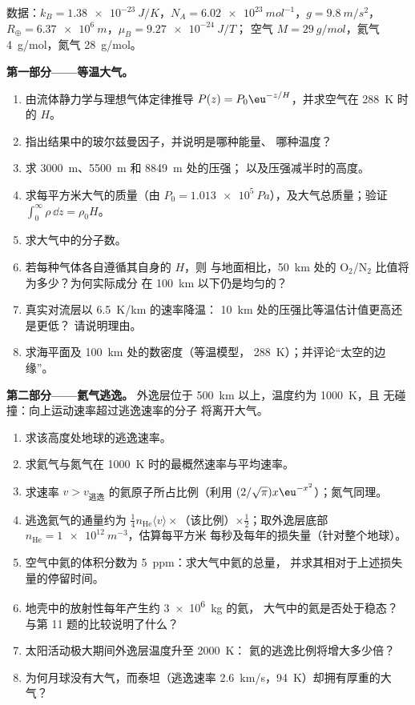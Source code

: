 \begin{problem}\label{pb:b2:boltzmann-factor:1}
数据：$k_B = \qty{1.38e-23}{J/K}$，$N_A = \qty{6.02e23}{mol^{-1}}$，$g =
\qty{9.8}{m/s^2}$，$R_{\oplus} = \qty{6.37e6}{m}$，$\mu_B = \qty{9.27e-24}{J/T}$；
空气 $M = \qty{29}{g/mol}$，氦气 \qty{4}{g/mol}，氮气 \qty{28}{g/mol}。

\textbf{第一部分——等温大气。}
\begin{enumerate}
  \item 由流体静力学与理想气体定律推导 $P(z) =
        P_0\eu^{-z/H}$，并求空气在 \qty{288}{K} 时的 $H$。
  \item 指出结果中的玻尔兹曼因子，并说明是哪种能量、
        哪种温度？
  \item 求 \qty{3000}{m}、\qty{5500}{m} 和 \qty{8849}{m} 处的压强；
        以及压强减半时的高度。
  \item 求每平方米大气的质量（由 $P_0 =
        \qty{1.013e5}{Pa}$），及大气总质量；验证 $\int_0^\infty
        \rho\,\dd z = \rho_0H$。
  \item 求大气中的分子数。
  \item 若每种气体各自遵循其自身的 $H$，则
        与地面相比，\qty{50}{km} 处的 O$_2$/N$_2$ 比值将为多少？为何实际成分
        在 \qty{100}{km} 以下仍是均匀的？
  \item 真实对流层以 \qty{6.5}{K/km} 的速率降温：
        \qty{10}{km} 处的压强比等温估计值更高还是更低？
        请说明理由。
  \item 求海平面及 \qty{100}{km} 处的数密度（等温模型，
        \qty{288}{K}）；并评论“太空的边缘”。
\end{enumerate}

\textbf{第二部分——氦气逃逸。}
外逸层位于 \qty{500}{km} 以上，温度约为 \qty{1000}{K}，且
无碰撞：向上运动速率超过逃逸速率的分子
将离开大气。
\begin{enumerate}[resume]
  \item 求该高度处地球的逃逸速率。
  \item 求氦气与氮气在
        \qty{1000}{K} 时的最概然速率与平均速率。
  \item 求速率 $v > v_{\text{逃逸}}$ 的氦原子所占比例（利用
        $(2/\sqrt\pi)x\eu^{-x^2}$）；氮气同理。
  \item 逃逸氦气的通量约为 $\tfrac14n_{\text{He}}\langle
        v\rangle \times$（该比例）$\times\tfrac12$；取外逸层底部 $n_{\text{He}}
        = \qty{1e12}{m^{-3}}$，估算每平方米
        每秒及每年的损失量（针对整个地球）。
  \item 空气中氦的体积分数为 \qty{5}{ppm}：求大气中氦的总量，
        并求其相对于上述损失量的停留时间。
  \item 地壳中的放射性每年产生约 \qty{3e6}{kg} 的氦，
        大气中的氦是否处于稳态？
        与第 11 题的比较说明了什么？
  \item 太阳活动极大期间外逸层温度升至 \qty{2000}{K}：
        氦的逃逸比例将增大多少倍？
  \item 为何月球没有大气，而泰坦（逃逸速率
        \qty{2.6}{km/s}，\qty{94}{K}）却拥有厚重的大气？
\end{enumerate}


\end{problem}
